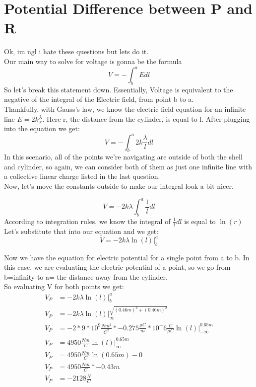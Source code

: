 \documentclass{article}
\begin{document}
\section{Potential Difference between P and R}
Ok, im ngl i hate these questions but lets do it.\\
Our main way to solve for voltage is gonna be the formula\\

\[
	V = -\int^a_{b} E dl 
\]
So let's break this statement down. Essentially, Voltage is equivalent to the negative of the integral of the Electric field, from point b to a.\\
Thankfully, with Gauss's law, we know the electric field equation for an infinite line $E = 2k\frac{\lambda}{r}$. Here r, the distance from the cylinder, is equal to l. After plugging into the equation we get:\\
\[
	V = -\int^{a}_{b} 2k\frac{\lambda}{l} dl
\]
In this scenario, all of the points we're navigating are outside of both the shell and cylinder, so again, we can consider both of them as just one infinite line with a collective  linear charge listed in the last question.\\
Now, let's move the constants outside to make our integral look a bit nicer.

\[
	V= -2k\lambda \int^{a}_{b} \frac{1}{l} dl
\]
According to integration rules, we know the integral of $\frac{1}{l}dl$ is equal to $\ln(r)$\\
Let's substitute that into our equation and we get:\\
\[
	V=-2k\lambda\ln(l)\bigg|^{a}_{b}
\]

Now we have the equation for electric potential for a single point from a to b. In this case, we are evaluating the electric potential of a point, so we go from b=infinity to a= the distance away from the cylinder. \\
So evaluating V for both points we get:\\
\begin{align*}
	V_{P} &= -2k\lambda\ln(l)\bigg|^a_{b}\\
	V_{P} &= -2k\lambda\ln(l)\bigg|^{\sqrt{(0.46m)^2 + (0.46m)^2} }_{\infty}\\
	V_{P} &= -2 * 9 * 10^9 \frac{Nm^2}{C^2} * -0.275 \frac{\mu C}{m} * 10^-6 \frac{C}{\mu C} \ln(l)\bigg|^{0.65m}_{-\infty}\\
	V_{P} &= 4950 \frac{Nm}{C} \ln(l)\bigg|^{0.65m}_{\infty}\\
	V_{P} &= 4950 \frac{Nm}{C}\ln(0.65m) -0\\
	V_{P} &= 4950 \frac{Nm}{C}* -0.43m\\
	V_{P} &= -2128 \frac{N}{C}
\end{align*}
\end{document}

